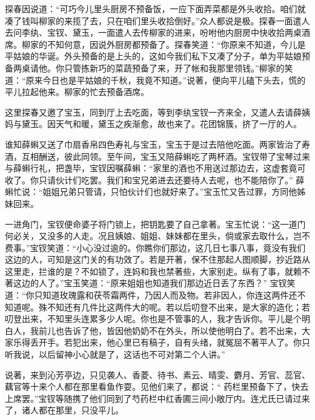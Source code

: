 \begin{parag}
    探春因说道：“可巧今儿里头厨房不预备饭，一应下面弄菜都是外头收拾。咱们就凑了钱叫柳家的来揽了去，只在咱们里头收拾倒好。”众人都说是极。探春一面遣人去问李纨、宝钗、黛玉，一面遣人去传柳家的进来，吩咐他内厨房中快收拾两桌酒席。柳家的不知何意，因说外厨房都预备了。探春笑道：“你原来不知道，今儿是平姑娘的华诞。外头预备的是上头的，这如今我们私下又凑了分子，单为平姑娘预备两桌请他。你只管拣新巧的菜蔬预备了来，开了帐和我那里领钱。”柳家的笑道：“原来今日也是平姑娘的千秋，我竟不知道。”说著，便向平儿磕下头去，慌的平儿拉起他来。柳家的忙去预备酒席。
\end{parag}


\begin{parag}
    这里探春又邀了宝玉，同到厅上去吃面，等到李纨宝钗一齐来全，又遣人去请薛姨妈与黛玉。因天气和暖，黛玉之疾渐愈，故也来了。花团锦簇，挤了一厅的人。
\end{parag}


\begin{parag}
    谁知薛蝌又送了巾扇香帛四色寿礼与宝玉，宝玉于是过去陪他吃面。两家皆治了寿酒，互相酬送，彼此同领。至午间，宝玉又陪薛蝌吃了两杯酒。宝钗带了宝琴过来与薛蝌行礼，把盏毕，宝钗因嘱薛蝌：“家里的酒也不用送过那边去，这虚套竟可收了。你只请伙计们吃罢。我们和宝兄弟进去还要待人去呢，也不能陪你了。” 薛蝌忙说：“姐姐兄弟只管请，只怕伙计们也就好来了。”宝玉忙又告过罪，方同他姊妹回来。
\end{parag}


\begin{parag}
    一进角门，宝钗便命婆子将门锁上，把钥匙要了自己拿著。宝玉忙说：“这一道门何必关，又没多的人走。况且姨娘、姐姐、妹妹都在里头，倘或家去取什么，岂不费事。”宝钗笑道：“小心没过逾的。你瞧你们那边，这几日七事八事，竟没有我们这边的人，可知是这门关的有功效了。若是开著，保不住那起人图顺脚，抄近路从这里走，拦谁的是？不如锁了，连妈和我也禁著些，大家别走。纵有了事，就赖不著这边的人了。”宝玉笑道：“原来姐姐也知道我们那边近日丢了东西？” 宝钗笑道：“你只知道玫瑰露和茯苓霜两件，乃因人而及物。若非因人，你连这两件还不知道呢。殊不知还有几件比这两件大的呢。若以后叨登不出来，是大家的造化；若叨登出来，不知里头连累多少人呢。你也是不管事的人，我才告诉你。平儿是个明白人，我前儿也告诉了他，皆因他奶奶不在外头，所以使他明白了。若不出来，大家乐得丢开手。若犯出来，他心里已有稿子，自有头绪，就冤屈不著平人了。你只听我说，以后留神小心就是了，这话也不可对第二个人讲。”
\end{parag}


\begin{parag}
    说著，来到沁芳亭边，只见袭人、香菱、待书、素云、晴雯、麝月、芳官、蕊官、藕官等十来个人都在那里看鱼作耍。见他们来了，都说：“ 药栏里预备下了，快去上席罢。”宝钗等随携了他们同到了芍药栏中红香圃三间小敞厅内。连尤氏已请过来了，诸人都在那里，只没平儿。
\end{parag}


